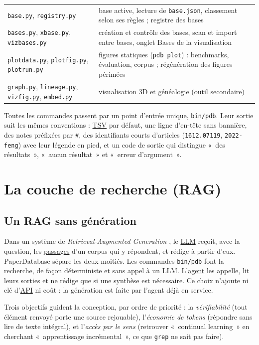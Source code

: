 \documentclass[11pt,a4paper]{article}
\newcommand{\cmd}[1]{\texttt{#1}}
\newcommand{\gl}[2]{\hyperlink{gl:#1}{\textcolor{glcolor}{#2}}}
\begin{document}
\begin{table}[ht]
\begin{tabularx}{\linewidth}{@{}lL@{}}
\cmd{base.py}, \cmd{registry.py} & base active, lecture de \cmd{base.json}, classement selon ses règles ; registre des bases \\
\cmd{bases.py}, \cmd{xbase.py}, \cmd{vizbases.py} & création et contrôle des bases, scan et import entre bases, onglet Bases de la visualisation \\
\cmd{plotdata.py}, \cmd{plotfig.py}, \cmd{plotrun.py} & figures statiques (\cmd{pdb plot}) : benchmarks, évaluation, corpus ; régénération des figures périmées \\
\cmd{graph.py}, \cmd{lineage.py}, \cmd{vizfig.py}, \cmd{embed.py} & visualisation 3D et généalogie (outil secondaire) \\
\bottomrule
\end{tabularx}
\end{table}

Toutes les commandes passent par un point d'entrée unique, \cmd{bin/pdb}. Leur sortie suit
les mêmes conventions : \gl{CSV}{TSV} par défaut, une ligne d'en-tête sans bannière, des notes
préfixées par \cmd{\#}, des identifiants courts d'articles (\cmd{1612.07119},
\cmd{2022-feng}) avec leur légende en pied, et un code de sortie qui distingue «~des
résultats~», «~aucun résultat~» et «~erreur d'argument~».

\section{La couche de recherche (RAG)}
\label{sec:rag}

\subsection{Un RAG sans génération}

Dans un système de \emph{Retrieval-Augmented Generation} \citep{lewis2020rag}, le \gl{LLM}{LLM}
reçoit, avec la question, les \gl{passage}{passages} d'un corpus qui y répondent, et rédige à partir
d'eux. PaperDatabase sépare les deux moitiés. Les commandes \cmd{bin/pdb} font la
recherche, de façon déterministe et sans appel à un LLM. L'\gl{agent}{agent} les appelle, lit leurs
sorties et ne rédige que si une synthèse est nécessaire. Ce choix n'ajoute ni clé d'\gl{API}{API} ni
coût : la génération est faite par l'agent déjà en service.

Trois objectifs guident la conception, par ordre de priorité : la \emph{vérifiabilité}
(tout élément renvoyé porte une source rejouable), l'\emph{économie de tokens} (répondre
sans lire de texte intégral), et l'\emph{accès par le sens} (retrouver «~continual
learning~» en cherchant «~apprentissage incrémental~», ce que \cmd{grep} ne sait pas faire).
\end{document}
